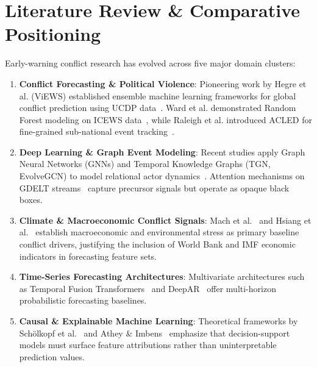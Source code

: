 \documentclass[conference]{IEEEtran}
\begin{document}
\section{Literature Review \& Comparative Positioning}
Early-warning conflict research has evolved across five major domain clusters:
\begin{enumerate}
    \item \textbf{Conflict Forecasting \& Political Violence}: Pioneering work by Hegre et al. (ViEWS) established ensemble machine learning frameworks for global conflict prediction using UCDP data~\cite{hegre2019views}. Ward et al. demonstrated Random Forest modeling on ICEWS data~\cite{ward2013predicting}, while Raleigh et al. introduced ACLED for fine-grained sub-national event tracking~\cite{raleigh2010introducing}.
    \item \textbf{Deep Learning \& Graph Event Modeling}: Recent studies apply Graph Neural Networks (GNNs) and Temporal Knowledge Graphs (TGN, EvolveGCN) to model relational actor dynamics~\cite{ma2023event, rossi2020temporal}. Attention mechanisms on GDELT streams~\cite{hossain2023identifying} capture precursor signals but operate as opaque black boxes.
    \item \textbf{Climate \& Macroeconomic Conflict Signals}: Mach et al.~\cite{mach2019climate} and Hsiang et al.~\cite{hsiang2013quantifying} establish macroeconomic and environmental stress as primary baseline conflict drivers, justifying the inclusion of World Bank and IMF economic indicators in forecasting feature sets.
    \item \textbf{Time-Series Forecasting Architectures}: Multivariate architectures such as Temporal Fusion Transformers~\cite{lim2021temporal} and DeepAR~\cite{salinas2020deepar} offer multi-horizon probabilistic forecasting baselines.
    \item \textbf{Causal \& Explainable Machine Learning}: Theoretical frameworks by Schölkopf et al.~\cite{scholkopf2021toward} and Athey \& Imbens~\cite{athey2022machine} emphasize that decision-support models must surface feature attributions rather than uninterpretable prediction values.
\end{enumerate}
\end{document}
